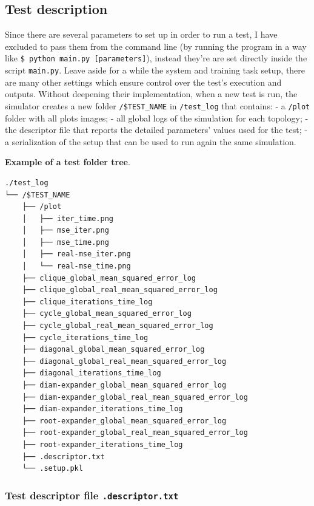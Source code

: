 \documentclass[11pt]{article}
\begin{document}
    \subsection{Test description}\label{test-description}

Since there are several parameters to set up in order to run a test, I
have excluded to pass them from the command line (by running the program
in a way like \texttt{\$\ python\ main.py\ {[}parameters{]}}), instead
they're are set directly inside the script \texttt{main.py}. Leave aside
for a while the system and training task setup, there are many other
settings which ensure control over the test's execution and outputs.
Without deepening their implementation, when a new test is run, the
simulator creates a new folder \texttt{/\$TEST\_NAME} in
\texttt{/test\_log} that contains: - a \texttt{/plot} folder with all
plots images; - all global logs of the simulation for each topology; -
the descriptor file that reports the detailed parameters' values used
for the test; - a serialization of the setup that can be used to run
again the same simulation.

    \textbf{Example of a test folder tree}.

\begin{verbatim}
./test_log
└── /$TEST_NAME
    ├── /plot
    │   ├── iter_time.png
    │   ├── mse_iter.png
    │   ├── mse_time.png
    │   ├── real-mse_iter.png
    │   └── real-mse_time.png
    ├── clique_global_mean_squared_error_log
    ├── clique_global_real_mean_squared_error_log
    ├── clique_iterations_time_log
    ├── cycle_global_mean_squared_error_log
    ├── cycle_global_real_mean_squared_error_log
    ├── cycle_iterations_time_log
    ├── diagonal_global_mean_squared_error_log
    ├── diagonal_global_real_mean_squared_error_log
    ├── diagonal_iterations_time_log
    ├── diam-expander_global_mean_squared_error_log
    ├── diam-expander_global_real_mean_squared_error_log
    ├── diam-expander_iterations_time_log
    ├── root-expander_global_mean_squared_error_log
    ├── root-expander_global_real_mean_squared_error_log
    ├── root-expander_iterations_time_log
    ├── .descriptor.txt
    └── .setup.pkl
\end{verbatim}

    \subsubsection{\texorpdfstring{Test descriptor file
\texttt{.descriptor.txt}}{Test descriptor file .descriptor.txt}}\label{test-descriptor-file-.descriptor.txt}
\end{document}
